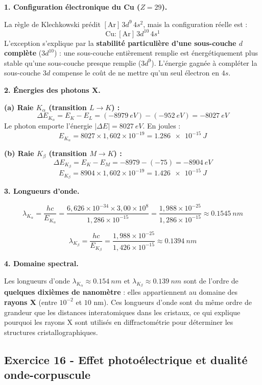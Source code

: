 \documentclass[12pt,a4paper]{article}
\begin{document}
\begin{boitecorrige}
\textbf{1. Configuration électronique du Cu ($Z=29$).}

La règle de Klechkowski prédit $[\text{Ar}]\,3d^9\,4s^2$, mais la configuration réelle est :
\[
\text{Cu} : [\text{Ar}]\,3d^{10}\,4s^1
\]
L'exception s'explique par la \textbf{stabilité particulière d'une sous-couche $d$ complète} ($3d^{10}$) : une sous-couche entièrement remplie est énergétiquement plus stable qu'une sous-couche presque remplie ($3d^9$). L'énergie gagnée à compléter la sous-couche $3d$ compense le coût de ne mettre qu'un seul électron en $4s$.

\textbf{2. Énergies des photons X.}

\textbf{(a) Raie $K_\alpha$ (transition $L \to K$) :}
\[
\Delta E_{K_\alpha} = E_K - E_L = (-\qty{8979}{eV}) - (-\qty{952}{eV}) = -\qty{8027}{eV}
\]
Le photon emporte l'énergie $|{\Delta E}| = \qty{8027}{eV}$. En joules :
\[
E_{K_\alpha} = 8027 \times 1{,}602\times10^{-19} = \qty{1.286e-15}{J}
\]

\textbf{(b) Raie $K_\beta$ (transition $M \to K$) :}
\[
\Delta E_{K_\beta} = E_K - E_M = -8979 - (-75) = -\qty{8904}{eV}
\]
\[
E_{K_\beta} = 8904 \times 1{,}602\times10^{-19} = \qty{1.426e-15}{J}
\]

\textbf{3. Longueurs d'onde.}

\[
\lambda_{K_\alpha} = \frac{hc}{E_{K_\alpha}} = \frac{6{,}626\times10^{-34}\times3{,}00\times10^8}{1{,}286\times10^{-15}} = \frac{1{,}988\times10^{-25}}{1{,}286\times10^{-15}} \approx \qty{0.1545}{nm}
\]

\[
\lambda_{K_\beta} = \frac{hc}{E_{K_\beta}} = \frac{1{,}988\times10^{-25}}{1{,}426\times10^{-15}} \approx \qty{0.1394}{nm}
\]

\textbf{4. Domaine spectral.}

Les longueurs d'onde $\lambda_{K_\alpha} \approx \qty{0.154}{nm}$ et $\lambda_{K_\beta} \approx \qty{0.139}{nm}$ sont de l'ordre de \textbf{quelques dixièmes de nanomètre} : elles appartiennent au domaine des \textbf{rayons X} (entre $10^{-2}$ et $10$ nm). Ces longueurs d'onde sont du même ordre de grandeur que les distances interatomiques dans les cristaux, ce qui explique pourquoi les rayons X sont utilisés en diffractométrie pour déterminer les structures cristallographiques.
\end{boitecorrige}


\subsection*{Exercice 16 - Effet photoélectrique et dualité onde-corpuscule \niveau{\moyen}}
\end{document}
